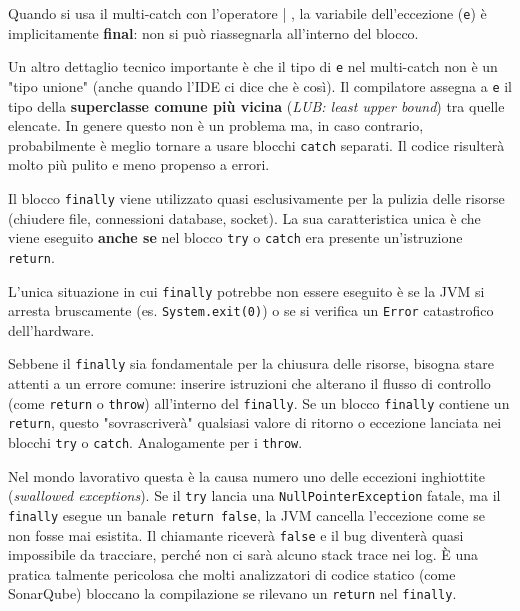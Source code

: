 \begin{warningbox}
    Quando si usa il multi-catch con l'operatore | , la variabile dell'eccezione (\texttt{e}) è implicitamente \textbf{final}: non si può riassegnarla all'interno del blocco.

    Un altro dettaglio tecnico importante è che il tipo di \texttt{e} nel multi-catch non è un "tipo unione" (anche quando l'IDE ci dice che è così). Il compilatore assegna a \texttt{e} il tipo della \textbf{superclasse comune più vicina} (\textit{LUB: least upper bound}) tra quelle elencate. In genere questo non è un problema ma, in caso contrario, probabilmente è meglio tornare a usare blocchi \texttt{catch} separati. Il codice risulterà molto più pulito e meno propenso a errori.
\end{warningbox}

Il blocco \texttt{finally} viene utilizzato quasi esclusivamente per la pulizia delle risorse (chiudere file, connessioni database, socket). La sua caratteristica unica è che viene eseguito \textbf{anche se} nel blocco \texttt{try} o \texttt{catch} era presente un'istruzione \texttt{return}.

L'unica situazione in cui \texttt{finally} potrebbe non essere eseguito è se la JVM si arresta bruscamente (es. \texttt{System.exit(0)}) o se si verifica un \texttt{Error} catastrofico dell'hardware.


\begin{danger}
Sebbene il \texttt{finally} sia fondamentale per la chiusura delle risorse, bisogna stare attenti a un errore comune: inserire istruzioni che alterano il flusso di controllo (come \texttt{return} o \texttt{throw}) all'interno del \texttt{finally}.
Se un blocco \texttt{finally} contiene un \texttt{return}, questo "sovrascriverà" qualsiasi valore di ritorno o eccezione lanciata nei blocchi \texttt{try} o \texttt{catch}. Analogamente per i \texttt{throw}.

Nel mondo lavorativo questa è la causa numero uno delle eccezioni inghiottite (\textit{swallowed exceptions}). Se il \texttt{try} lancia una \texttt{NullPointerException} fatale, ma il \texttt{finally} esegue un banale \texttt{return false}, la JVM cancella l'eccezione come se non fosse mai esistita. Il chiamante riceverà \texttt{false} e il bug diventerà quasi impossibile da tracciare, perché non ci sarà alcuno stack trace nei log. È una pratica talmente pericolosa che molti analizzatori di codice statico (come SonarQube) bloccano la compilazione se rilevano un \texttt{return} nel \texttt{finally}.
\end{danger}

